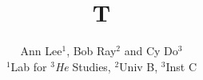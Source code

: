 \documentclass{article}
\begin{document}
\title{T}
\author{Ann Lee$^{1}$, Bob Ray$^{2}$ and Cy Do$^{3}$\\
$^{1}$Lab for \textit{$^{3}$He} Studies, $^{2}$Univ B, $^{3}$Inst C}
\maketitle
\end{document}
